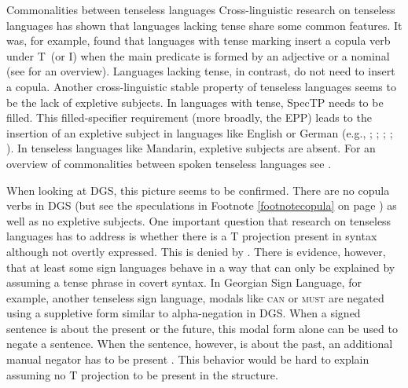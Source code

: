 \begin{digression}{Commonalities between tenseless languages}{}
\noindent Cross-linguistic research on tenseless languages has shown that languages lacking tense share some common features. It was, for example, found that languages with tense marking insert a copula verb under T\textdegree\ (or I\textdegree ) when the main predicate is formed by an adjective or a nominal (see \citealt{lin2012tenselessness} for an overview). Languages lacking tense, in contrast, do not need to insert a copula. Another cross-linguistic stable property of tenseless languages seems to be the lack of expletive subjects. In languages with tense, SpecTP needs to be filled. This filled-specifier requirement (more broadly, the EPP) leads to the insertion of an expletive subject in languages like English or German (e.g., \citealt{chomsky1995categories}; \citealt{chomsky1999}; \citealt{chomsky2000minimalist}; \citealt{lasnik2001can}; \citealt{roberts2002tended}). In tenseless languages like Mandarin, expletive subjects are absent. For an overview of commonalities between spoken tenseless languages see \citet{lin2006time, lin2012tenselessness}. 

When looking at DGS, this picture seems to be confirmed. There are no copula verbs in DGS (but see the speculations in Footnote \ref{footnotecopula} on page \pageref{footnotecopula}) as well as no expletive subjects. One important question that research on tenseless languages has to address is whether there is a T projection present in syntax although not overtly expressed. This is denied by \citet{lin2006time, lin2012tenselessness}. There is evidence, however, that at least some sign languages behave in a way that can only be explained by assuming a tense phrase in covert syntax. In Georgian Sign Language, for example, another tenseless sign language, modals like \textsc{can} or \textsc{must} are negated using a suppletive form similar to alpha-negation in DGS. When a signed sentence is about the present or the future, this modal form alone can be used to negate a sentence. When the sentence, however, is about the past, an additional manual negator has to be present \citep{makharoblizdepfau2018negationtense}. This behavior would be hard to explain assuming no T projection to be present in the structure.
\end{digression}

